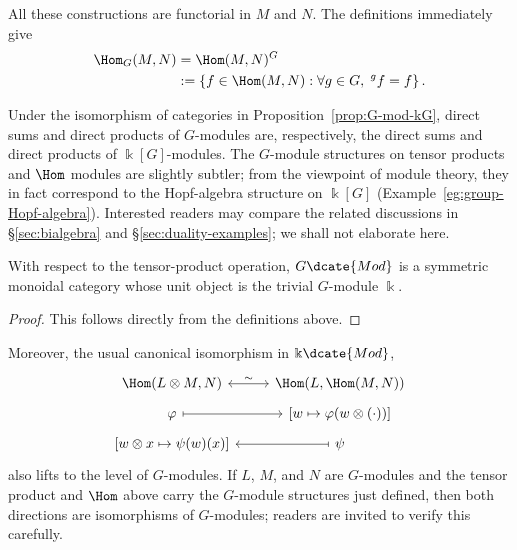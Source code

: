 All these constructions are functorial in $M$ and $N$. The definitions
immediately give
\begin{align*}
	\Hom_G(M, N) & = \Hom(M, N)^G \\
	& := \left\{f \in \Hom(M, N): \forall g \in G, \; {}^g f = f \right\}.
\end{align*}

Under the isomorphism of categories in Proposition~\ref{prop:G-mod-kG}, direct
sums and direct products of $G$-modules are, respectively, the direct sums and
direct products of $\Bbbk[G]$-modules. The $G$-module structures on tensor
products and $\Hom$ modules are slightly subtler; from the viewpoint of module
theory, they in fact correspond to the Hopf-algebra structure on $\Bbbk[G]$
(Example~\ref{eg:group-Hopf-algebra}). Interested readers may compare the
related discussions in \S\ref{sec:bialgebra} and
\S\ref{sec:duality-examples}; we shall not elaborate here.

\begin{proposition}\label{prop:Gmod-monoidal}
	With respect to the tensor-product operation, $G\dcate{Mod}$ is a symmetric
	monoidal category whose unit object is the trivial $G$-module $\Bbbk$.
\end{proposition}

\begin{proof}
	This follows directly from the definitions above.
\end{proof}

Moreover, the usual canonical isomorphism in $\Bbbk\dcate{Mod}$,
\begin{equation*}
	\begin{tikzcd}[row sep=tiny]
		\Hom(L \otimes M, N) \arrow[leftrightarrow, r, "\sim"] & \Hom(L, \Hom(M, N)) \\
		\varphi \arrow[mapsto, r] & {\left[ w \mapsto \varphi(w \otimes (\cdot)) \right]} \\
		{\left[ w \otimes x \mapsto \psi(w)(x) \right]} & \psi \arrow[mapsto, l]
	\end{tikzcd}
\end{equation*}
also lifts to the level of $G$-modules. If $L$, $M$, and $N$ are $G$-modules
and the tensor product and $\Hom$ above carry the $G$-module structures just
defined, then both directions are isomorphisms of $G$-modules; readers are
invited to verify this carefully.

